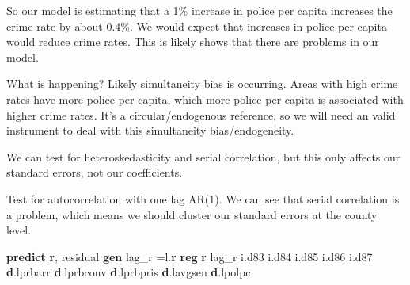 \documentclass[
]{book}
\newenvironment{Shaded}{\begin{snugshade}}{\end{snugshade}}
\newcommand{\FunctionTok}[1]{\textcolor[rgb]{0.13,0.29,0.53}{\textbf{#1}}}
\newcommand{\KeywordTok}[1]{\textcolor[rgb]{0.13,0.29,0.53}{\textbf{#1}}}
\newcommand{\NormalTok}[1]{#1}
\newcommand{\OtherTok}[1]{\textcolor[rgb]{0.56,0.35,0.01}{#1}}
\begin{document}
So our model is estimating that a 1\% increase in police per capita increases the crime rate by about 0.4\%. We would expect that increases in police per capita would reduce crime rates. This is likely shows that there are problems in our model.

What is happening? Likely simultaneity bias is occurring. Areas with high crime rates have more police per capita, which more police per capita is associated with higher crime rates. It's a circular/endogenous reference, so we will need an valid instrument to deal with this simultaneity bias/endogeneity.

We can test for heteroskedasticity and serial correlation, but this only affects our standard errors, not our coefficients.

Test for autocorrelation with one lag AR(1). We can see that serial correlation is a problem, which means we should cluster our standard errors at the county level.

\begin{Shaded}
\begin{Highlighting}[]
\KeywordTok{predict} \FunctionTok{r}\NormalTok{, residual}
\KeywordTok{gen}\NormalTok{ lag\_r =}\OtherTok{l}\NormalTok{.}\FunctionTok{r}
\KeywordTok{reg} \FunctionTok{r}\NormalTok{ lag\_r i.d83 i.d84 i.d85 i.d86 i.d87 }\KeywordTok{d}\NormalTok{.lprbarr }\KeywordTok{d}\NormalTok{.lprbconv }\KeywordTok{d}\NormalTok{.lprbpris }\KeywordTok{d}\NormalTok{.lavgsen }\KeywordTok{d}\NormalTok{.lpolpc}
\end{Highlighting}
\end{Shaded}
\end{document}
